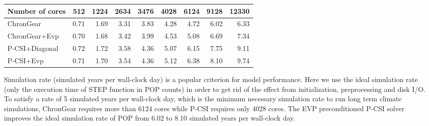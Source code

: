 \begin{table*}
\centering
\caption {Ideal simulation rate of 0.1\degree POP \label{tab:improve_01}}
\begin{tabular}{|l|r|r|r|r|r|r|r|r|}
\hline
Number of cores & 512  & 1224   & 2634 & 3476 & 4028 & 6124 & 9128 & 12330\\
\hline
ChronGear     &0.71 &1.69&3.31  &3.83 &4.28 &4.72&6.02 &6.33\\\hline
ChronGear+Evp &0.70 &1.68&3.42  &3.99 &4.53 &5.08&6.69 &7.34\\\hline
P-CSI+Diagonal  &0.72 &1.72&3.58  &4.36 &5.07 &6.15&7.75& 9.11\\\hline
P-CSI+Evp	      &0.71 &1.70&3.54  &4.36 &5.12 &6.38&8.10 & 9.74\\
\hline
\end{tabular}
\end{table*}
Simulation rate (simulated years per wall-clock day) is a popular criterion for model performance. Here we use the ideal simulation rate (only the execution time of STEP function in POP counts) in order to get rid of the effect from initialization, preprocessing  and disk I/O. To satisfy a rate of 5 simulated years per wall-clock day, which is the minimum necessary simulation rate to run long term climate simulations, ChronGear requires more than 6124 cores while P-CSI requires only 4028 cores. 
The EVP preconditioned P-CSI solver improves the ideal simulation rate of POP from 6.02 to 8.10 simulated years per wall-clock day. 

